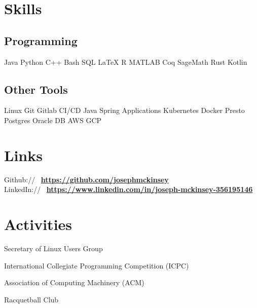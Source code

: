 \documentclass[]{deedy-resume-openfont}
\begin{document}
\begin{minipage}[t]{0.42\textwidth}

\section{Skills}
\subsection{Programming}
 Java \textbullet{} Python \textbullet{} C++
\textbullet{} Bash \textbullet{} SQL \textbullet{} \LaTeX \textbullet{} R \textbullet{} MATLAB
\textbullet{} Coq \textbullet{} SageMath \textbullet{} Rust \textbullet{}
Kotlin
\sectionsep

\subsection{Other Tools}
Linux \textbullet{} Git \textbullet{} Gitlab CI/CD \textbullet{} Java Spring Applications \textbullet{} Kubernetes
\textbullet{} Docker \textbullet{} Presto \textbullet{} Postgres \textbullet{}
  Oracle DB \textbullet{} AWS \textbullet{} GCP
\sectionsep



\section{Links} 
Github:// \, \href{https://github.com/josephmckinsey}{\bf https://github.com/josephmckinsey} \\
LinkedIn:// \, \href{https://www.linkedin.com/in/joseph-mckinsey-356195146/}{\bf https://www.linkedin.com/in/joseph-mckinsey-356195146} \\
\sectionsep

\section{Activities}
\vspace{\topsep} %
\begin{tightemize}
\item Secretary of Linux Users Group
\item International Collegiate Programming Competition (ICPC)
\item Association of Computing Machinery (ACM)
\item Racquetball Club
\end{tightemize}
\sectionsep


\end{minipage}
\end{document}
